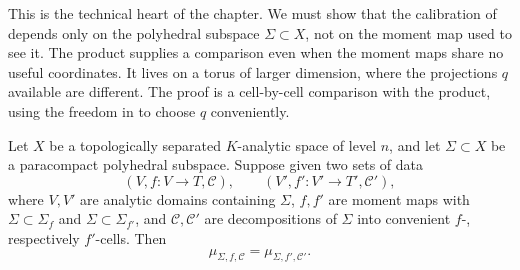 This is the technical heart of the chapter. We must show that the
calibration of  depends only on the
polyhedral subspace $\Sigma\subset X$, not on the moment map used to see it.
The product supplies a comparison even when the moment maps share no useful
coordinates. It lives on a torus of larger dimension, where
the projections $q$ available are different. The proof is a cell-by-cell
comparison with the product, using the freedom in
 to choose $q$ conveniently.

\begin{theorem}
\label{thm:trop-calibration-chart-independent}
Let $X$ be a topologically separated $K$-analytic space of level $n$, and
let $\Sigma\subset X$ be a paracompact polyhedral subspace. Suppose given
two sets of data
\[
 (V,f:V\to T,\mathscr C),\qquad (V',f':V'\to T',\mathscr C'),
\]
where $V,V'$ are analytic domains containing $\Sigma$, $f,f'$ are moment
maps with $\Sigma\subset\Sigma_f$ and $\Sigma\subset\Sigma_{f'}$, and
$\mathscr C,\mathscr C'$ are decompositions of $\Sigma$ into convenient
$f$-, respectively $f'$-cells. Then
\[
 \mu_{\Sigma,f,\mathscr C}=\mu_{\Sigma,f',\mathscr C'}.
\]
\end{theorem}

